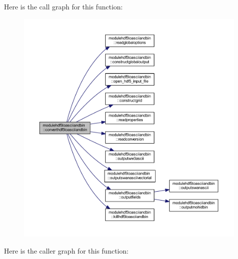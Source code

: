 Here is the call graph for this function\+:\nopagebreak
\begin{figure}[H]
\begin{center}
\leavevmode
\includegraphics[width=350pt]{namespacemodulehdf5toasciiandbin_a043d466c48df398adb80b3cb771a0b47_cgraph}
\end{center}
\end{figure}
Here is the caller graph for this function\+:\nopagebreak
